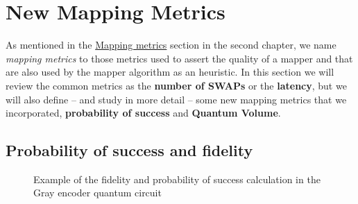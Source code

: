 \section{New Mapping Metrics}
\label{sec:org07df8d9}
As mentioned in the \href{chapter-2.org}{Mapping metrics} section in the second chapter, we name \emph{mapping metrics} to those metrics used to assert the quality of a mapper and that are also used by the mapper algorithm as an heuristic.
In this section we will review the common metrics as the \textbf{number of SWAPs} or the \textbf{latency}, but we will also define -- and study in more detail -- some new mapping metrics that we incorporated, \textbf{probability of success} and \textbf{Quantum Volume}.

\subsection{Probability of success and fidelity}
\label{sec:org608308c}

\begin{figure}
    \centering

\caption{Example of the fidelity and probability of success calculation in the Gray encoder quantum circuit}
\label{fig:latency_swaps_ex_orig}
\end{figure}

